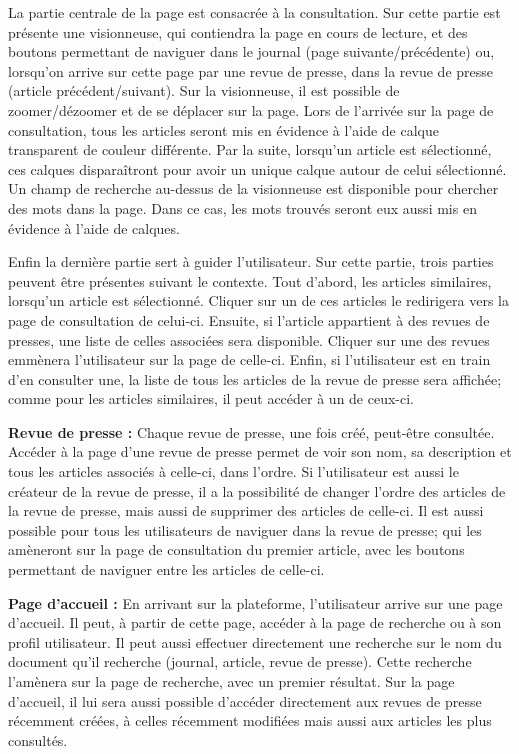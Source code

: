 	La partie centrale de la page est consacrée à la consultation. Sur cette partie est présente une visionneuse, qui contiendra la page en cours de lecture, et des boutons permettant de naviguer dans le journal (page suivante/précédente) ou, lorsqu'on arrive sur cette page par une revue de presse, dans la revue de presse (article précédent/suivant). Sur la visionneuse, il est possible de zoomer/dézoomer et de se déplacer sur la page. Lors de l'arrivée sur la page de consultation, tous les articles seront mis en évidence à l'aide de calque transparent de couleur différente. Par la suite, lorsqu'un article est sélectionné, ces calques disparaîtront pour avoir un unique calque autour de celui sélectionné. Un champ de recherche au-dessus de la visionneuse est disponible pour chercher des mots dans la page. Dans ce cas, les mots trouvés seront eux aussi mis en évidence à l'aide de calques. 
	
	Enfin la dernière partie sert à guider l'utilisateur. Sur cette partie, trois parties peuvent être présentes suivant le contexte. Tout d'abord, les articles similaires, lorsqu'un article est sélectionné. Cliquer sur un de ces articles le redirigera vers la page de consultation de celui-ci. Ensuite, si l'article appartient à des revues de presses, une liste de celles associées sera disponible. Cliquer sur une des revues emmènera l'utilisateur sur la page de celle-ci. Enfin, si l'utilisateur est en train d'en consulter une, la liste de tous les articles de la revue de presse sera affichée; comme pour les articles similaires, il peut accéder à un de ceux-ci.

	\textbf{Revue de presse :} Chaque revue de presse, une fois créé, peut-être consultée. Accéder à la page d'une revue de presse permet de voir son nom, sa description et tous les articles associés à celle-ci, dans l'ordre. Si l'utilisateur est aussi le créateur de la revue de presse, il a la possibilité de changer l'ordre des articles de la revue de presse, mais aussi de supprimer des articles de celle-ci. Il est aussi possible pour tous les utilisateurs de naviguer dans la revue de presse; qui les amèneront sur la page de consultation du premier article, avec les boutons permettant de naviguer entre les articles de celle-ci.

	\textbf{Page d'accueil :} En arrivant sur la plateforme, l'utilisateur arrive sur une page d'accueil. Il peut, à partir de cette page, accéder à la page de recherche ou à son profil utilisateur. Il peut aussi effectuer directement une recherche sur le nom du document qu'il recherche (journal, article, revue de presse). Cette recherche l'amènera sur la page de recherche, avec un premier résultat. Sur la page d'accueil, il lui sera aussi possible d'accéder directement aux revues de presse récemment créées, à celles récemment modifiées mais aussi aux articles les plus consultés.

